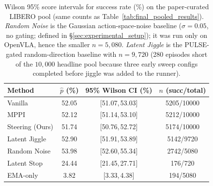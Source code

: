 \begin{table}[t]
\centering
\caption{Wilson 95\% score intervals for success rate (\%) on the paper-curated LIBERO pool (same counts as Table~\ref{tab:final_pooled_results}). \emph{Random Noise} is the Gaussian action-space-noise baseline ($\sigma{=}0.05$, no gating; defined in \S\ref{sec:experimental_setup}); it was run only on OpenVLA, hence the smaller $n{=}5{,}080$. \emph{Latent Jiggle} is the PULSE-gated random-direction baseline with $n{=}9{,}720$ (280 episodes short of the $10{,}000$ headline pool because three early sweep configs completed before jiggle was added to the runner).}
\label{tab:wilson_paper_curated}
\begin{tabular}{lccc}
\toprule
Method & $\hat p$ (\%) & 95\% Wilson CI (\%) & $n$ (succ/total) \\
\midrule
Vanilla & 52.05 & [51.07,\,53.03] & 5205/10000 \\
MPPI & 52.12 & [51.14,\,53.10] & 5212/10000 \\
Steering (Ours) & 51.74 & [50.76,\,52.72] & 5174/10000 \\
Latent Jiggle & 52.90 & [51.91,\,53.89] & 5142/9720 \\
Random Noise & 53.98 & [52.60,\,55.34] & 2742/5080 \\
Latent Stop & 24.44 & [21.45,\,27.71] & 176/720 \\
EMA-only & 3.82 & [3.33,\,4.38] & 194/5080 \\
\bottomrule
\end{tabular}
\end{table}
